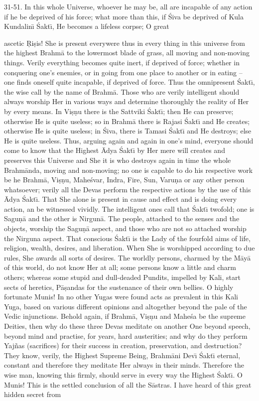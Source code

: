 31-51. In this whole Universe, whoever he may be, all are incapable of any action if he be deprived of his force; what more than this, if \'Siva be deprived of Kula Kundalin\={\i} \'Sakt\={\i}, He becomes a lifeless corpse; O great

ascetic \d{R}i\d{s}is! She is present everywere thus in every thing in this universe from the highest Brahm\=a to the lowermost blade of grass, all moving and non-moving things. Verily everything becomes quite inert, if deprived of force; whether in conquering one's enemies, or in going from one place to another or in eating -- one finds oneself quite incapable, if deprived of force. Thus the omnipresent \'Sakt\={\i}, the wise call by the name of Brahm\=a. Those who are verily intelligent should always worship Her in various ways and determine thoroughly the reality of Her by every means. In Vi\d{s}\d{n}u there is the Sattviki \'Sakt\={\i}; then He can preserve; otherwise He is quite useless; so in Brahm\=a there is Rajasi \'Sakt\={\i} and He creates; otherwise He is quite useless; in \'Siva, there is Tamasi \'Sakt\={\i} and He destroys; else He is quite useless. Thus, arguing again and again in one's mind, everyone should come to know that the Highest \=Adya \'Sakt\={\i} by Her mere will creates and preserves this Universe and She it is who destroys again in time the whole Brahm\=anda, moving and non-moving; no one is capable to do his respective work be he Brahm\=a, Vi\d{s}\d{n}u, Mahe\'svar, Indra, Fire, Sun, Varu\d{n}a or any other person whatsoever; verily all the Devas perform the respective actions by the use of this \=Adya \'Sakt\={\i}. That She alone is present in cause and effect and is doing every action, an be witnessed vividly. The intelligent ones call that \'Sakt\={\i} twofold; one is Sagu\d{n}\=a and the other is Nirgun\=a. The people, attached to the senses and the objects, worship the Sagu\d{n}\=a aspect, and those who are not so attached worship the Nirguna aspect. That conscious \'Sakt\={\i} is the Lady of the fourfold aims of life, religion, wealth, desires, and liberation. When She is worshipped according to due rules, She awards all sorts of desires. The worldly persons, charmed by the M\=ay\=a of this world, do not know Her at all; some persons know a little and charm others; whereas some stupid and dull-deaded Pundits, impelled by Kali, start sects of heretics, P\=a\d{s}andas for the sustenance of their own bellies. O highly fortunate Munis! In no other Yugas were found acts as prevalent in this Kali Yuga, based on various different opinions and altogether beyond the pale of the Vedic injunctions. Behold again, if Brahm\=a, Vi\d{s}\d{n}u and Mahe\'sa be the supreme Deities, then why do these three Devas meditate on another One beyond speech, beyond mind and practise, for years, hard austerities; and why do they perform Yaj\~nas (sacrifices) for their success in creation, preservation, and destruction? They know, verily, the Highest Supreme Being, Brahm\=ani Dev\={\i} \'Sakt\={\i} eternal, constant and therefore they meditate Her always in their minds. Therefore the wise man, knowing this firmly, should serve in every way the Highest \'Sakt\={\i}. O Munis! This is the settled conclusion of all the S\=astras. I have heard of this great hidden secret from 
